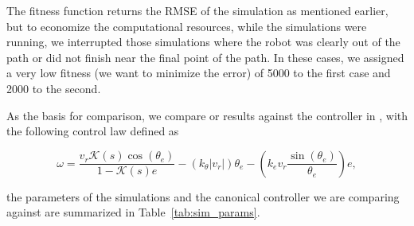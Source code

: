 \documentclass[symmetry,article,submit,moreauthors,pdftex]{Definitions/mdpi}
\begin{document}
The fitness function returns the RMSE of the simulation as mentioned earlier,
but to economize the
computational resources, while the simulations were running, we interrupted
those simulations where the robot was clearly out of the path or did not
finish near the final point of the path. In these cases, we assigned a very
low fitness (we want to minimize the error) of 5000 to the first case and 2000
to the second.  

As the basis for comparison, we compare or results against the controller in
\cite{paden_survey_2016}, with the following control law defined as 

\begin{equation}\label{eq:controller}
\omega = \frac{v_r \mathcal{K}(s) \cos(\theta_e)}{1 - \mathcal{K}(s)e} -
  (k_{\theta}|v_r|)\theta_e - \left( k_ev_r \frac{\sin(\theta_e)}{\theta_e}\right) e,
\end{equation}

the parameters of the simulations and the canonical controller we are comparing
against are summarized in Table~\ref{tab:sim_params}.
\end{document}
